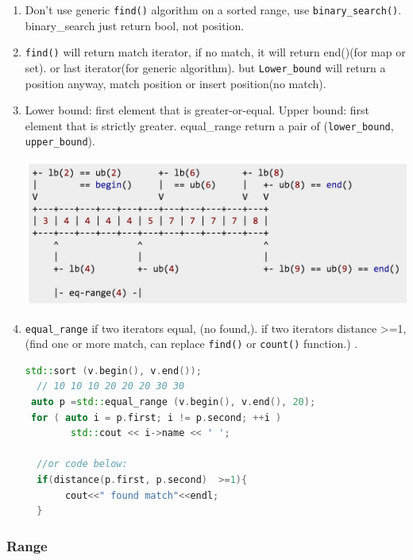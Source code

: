 \documentclass[a4paper,11pt,twoside]{book}
\begin{document}
\begin{itemize}
\begin{enumerate}
\item Don't use generic \texttt{find()} algorithm on a sorted range,  use \texttt{binary\_search()}. binary\_search just return bool, not position.

\item  \texttt{find()} will return match iterator, if no match, it will return end()(for map or set). or last iterator(for generic algorithm). but \texttt{Lower\_bound}  will return a position anyway, match position or insert position(no match).

\item Lower bound: first element that is greater-or-equal. Upper bound: first element that is strictly greater. equal\_range return a pair of (\texttt{lower\_bound}, \texttt{upper\_bound}).

\begin{center}
	\includegraphics[scale=0.5]{pics/lowerupper.png}
\end{center}


\item \texttt{equal\_range} if two iterators equal, (no found,). if two iterators distance >=1, (find one or more match, can replace \texttt{find()} or \texttt{count()} function.) .
\begin{lstlisting}[frame=single, language=c++]
  std::sort (v.begin(), v.end());
  // 10 10 10 20 20 20 30 30
 auto p =std::equal_range (v.begin(), v.end(), 20);
 for ( auto i = p.first; i != p.second; ++i )
        std::cout << i->name << ' ';

  //or code below:
  if(distance(p.first, p.second)  >=1){
       cout<<" found match"<<endl;
  }
\end{lstlisting}

\end{enumerate}
\end{itemize}


\subsubsection{Range}
\end{document}
